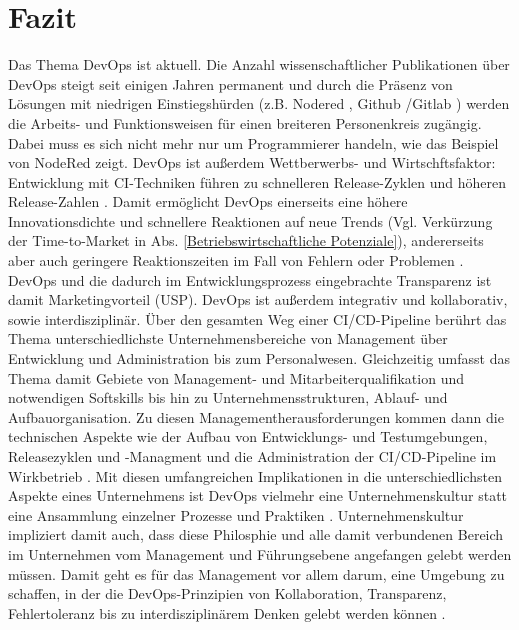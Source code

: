 \section{Fazit}
\label{Fazit}
Das Thema \gls{DevOps} ist aktuell. Die Anzahl wissenschaftlicher Publikationen über \gls{DevOps} steigt seit einigen Jahren permanent \cite{leite_survey_2020} und durch die Präsenz von Lösungen mit niedrigen Einstiegshürden (z.B. Nodered \cite{nodered_about}, Github \cite{DevOps_Definition_Microsoft}/Gitlab \cite{gitlab_devops}) werden die Arbeits- und Funktionsweisen für einen breiteren Personenkreis zugängig. Dabei muss es sich nicht mehr nur um Programmierer handeln, wie das Beispiel von NodeRed zeigt.
\gls{DevOps} ist außerdem Wettberwerbs- und Wirtschftsfaktor: Entwicklung mit \acrshort{CI}-Techniken führen zu schnelleren Release-Zyklen und höheren Release-Zahlen \cite{forsgren_devops_2015} \cite{hilton_usage_2016}. Damit ermöglicht \gls{DevOps} einerseits eine höhere Innovationsdichte und schnellere Reaktionen auf neue Trends (Vgl. Verkürzung der \gls{Time-to-Market} in Abs. \ref{Betriebswirtschaftliche Potenziale}), andererseits aber auch geringere Reaktionszeiten im Fall von Fehlern oder Problemen \cite{zhao_impact_2017}. \gls{DevOps} und die dadurch im Entwicklungsprozess eingebrachte Transparenz ist damit Marketingvorteil (\acrshort{USP}).
\gls{DevOps} ist außerdem integrativ und kollaborativ, sowie interdisziplinär. Über den gesamten Weg einer \acrshort{CI}/\acrshort{CD}-Pipeline berührt das Thema unterschiedlichste Unternehmensbereiche von Management über Entwicklung und Administration bis zum Personalwesen. Gleichzeitig umfasst das Thema damit Gebiete von Management- und Mitarbeiterqualifikation und notwendigen Softskills bis hin zu Unternehmensstrukturen, Ablauf- und Aufbauorganisation. Zu diesen Managementherausforderungen kommen dann die technischen Aspekte wie der Aufbau von Entwicklungs- und Testumgebungen, Releasezyklen und -Managment und die Administration der \acrshort{CI}/\acrshort{CD}-Pipeline im Wirkbetrieb \cite[Abb. 5 bis 8]{leite_survey_2020}. 
Mit diesen umfangreichen Implikationen in die unterschiedlichsten Aspekte eines Unternehmens ist  \gls{DevOps} vielmehr eine Unternehmenskultur statt eine Ansammlung einzelner Prozesse und Praktiken \cite{DevOps_Definition_Microsoft} \cite{DevOps_Definition_AWS}. Unternehmenskultur impliziert damit auch, dass diese Philosphie und alle damit verbundenen Bereich im Unternehmen vom Management und Führungsebene angefangen gelebt werden müssen. Damit geht es für das Management vor allem darum, eine Umgebung zu schaffen, in der die \gls{DevOps}-Prinzipien von Kollaboration, Transparenz, Fehlertoleranz bis zu interdisziplinärem Denken gelebt werden können \cite[Abschnitt 7.2]{leite_survey_2020}.
